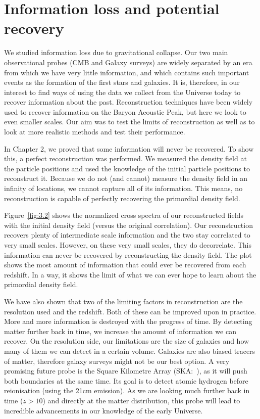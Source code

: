
\section{Information loss and potential recovery}

We studied information loss due to gravitational collapse. Our two main observational probes (CMB and Galaxy surveys) are widely separated by an era from which we have very little information, and which contains such important events as the formation of the first stars and galaxies. It is, therefore, in our interest to find ways of using the data we collect from the Universe today to recover information about the past. Reconstruction techniques have been widely used to recover information on the Baryon Acoustic Peak, but here we look to even smaller scales. Our aim was to test the limits of reconstruction as well as to look at more realistic methods and test their performance.

In Chapter 2, we proved that some information will never be recovered. To show this, a perfect reconstruction was performed. We measured the density field at the particle positions and used the knowledge of the initial particle positions to reconstruct it. Because we do not (and cannot) measure the density field in an infinity of locations, we cannot capture all of its information. This means, no reconstruction is capable of perfectly recovering the primordial density field.

Figure~\ref{fig:3.2} shows the normalized cross spectra of our reconstructed fields with the initial density field (versus the original correlation). Our reconstruction recovers plenty of  intermediate scale information and the two stay correlated to very small scales. However, on these very small scales, they do decorrelate. This information can never be recovered by reconstructing the density field. The plot shows the most amount of information that could ever be recovered from each redshift. In a way, it shows the limit of what we can ever hope to learn about the primordial density field. 

We have also shown that two of the limiting factors in reconstruction are the resolution used and the redshift. Both of these can be improved upon in practice. More and more information is destroyed with the progress of time. By detecting matter further back in time, we increase the amount of information we can recover. On the resolution side, our limitations are the size of galaxies and how many of them we can detect in a certain volume. Galaxies are also biased tracers of matter, therefore galaxy surveys might not be our best option. A very promising future probe is the Square Kilometre Array (SKA:~\cite{dewdney2009square}), as it will push both boundaries at the same time. Its goal is to detect atomic hydrogen before reionisation (using the 21cm emission). As we are looking much further back in time ($z>10$) and directly at the matter distribution, this probe will lead to incredible advancements in our knowledge of the early Universe.


